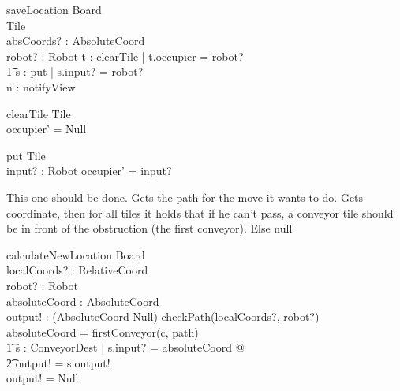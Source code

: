 \documentclass[a4paper,11pt]{article}
\begin{document}
\begin{schema}{saveLocation}
\Xi Board \\
\Delta Tile \\
absCoords? : AbsoluteCoord \\
robot? : Robot
\where
\exists t : clearTile | t.occupier = robot?\\ \t1
\exists s : put | s.input? = robot? \\
\exists n : notifyView
\end{schema}

\begin{schema}{clearTile}
\Delta Tile \\
\where
occupier' = Null
\end{schema}

\begin{schema}{put}
\Delta Tile \\
input? : Robot
\where
occupier' = input?
\end{schema}

This one should be done. Gets the path for the move it wants to do. Gets coordinate, then for all tiles it holds that if he can't pass, a conveyor tile should be in front of the obstruction (the first conveyor). Else null
\begin{schema}{calculateNewLocation}
\Xi Board \\
localCoords? : RelativeCoord \\
robot? : Robot \\
absoluteCoord : AbsoluteCoord \\
output! : (AbsoluteCoord \union Null) 
\where
\IF checkPath(localCoords?, robot?) \\
\THEN absoluteCoord = firstConveyor(c, path) \\ \t1
\exists s : ConveyorDest | s.input? = absoluteCoord @ \\ \t2
output! = s.output! \\
\ELSE output! = Null
\end{schema}
\end{document}
